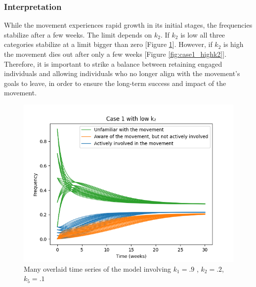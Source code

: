 \documentclass{article}
\begin{document}
    \subsubsection*{Interpretation}  While the movement experiences rapid growth in its initial stages, the frequencies stabilize after a few weeks. The limit depends on $k_2$. If $k_2$ is low all three categories stabilize at a limit bigger than zero [Figure \ref{fig:case1_lowk2}]. However, if $k_2$ is high the movement dies out after only  a few weeks [Figure \ref{fig:case1_highk2}]. Therefore, it is important to strike a balance between retaining engaged individuals and allowing individuals who no longer align with the movement's goals to leave, in order to ensure the long-term success and impact of the movement.

    \begin{figure}[H]

        \centering
        \includegraphics[width=\textwidth]{simulation/plots/case1-lowk2.png}   
        \caption{Many overlaid time series of the model involving \mbox{$k_1=.9$} , \mbox{$k_2=.2$}, \mbox{$k_5=.1$}}
        \label{fig:case1_lowk2}
    \end{figure}
\end{document}
